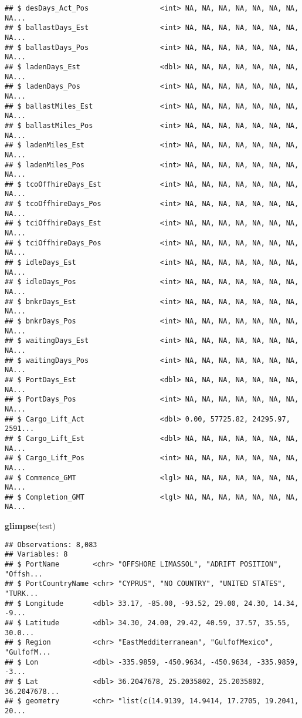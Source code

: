 \documentclass[]{article}
\newenvironment{Shaded}{\begin{snugshade}}{\end{snugshade}}
\newcommand{\KeywordTok}[1]{\textcolor[rgb]{0.13,0.29,0.53}{\textbf{#1}}}
\newcommand{\NormalTok}[1]{#1}
\begin{document}
\begin{verbatim}
## $ desDays_Act_Pos                 <int> NA, NA, NA, NA, NA, NA, NA, NA...
## $ ballastDays_Est                 <int> NA, NA, NA, NA, NA, NA, NA, NA...
## $ ballastDays_Pos                 <int> NA, NA, NA, NA, NA, NA, NA, NA...
## $ ladenDays_Est                   <dbl> NA, NA, NA, NA, NA, NA, NA, NA...
## $ ladenDays_Pos                   <int> NA, NA, NA, NA, NA, NA, NA, NA...
## $ ballastMiles_Est                <int> NA, NA, NA, NA, NA, NA, NA, NA...
## $ ballastMiles_Pos                <int> NA, NA, NA, NA, NA, NA, NA, NA...
## $ ladenMiles_Est                  <int> NA, NA, NA, NA, NA, NA, NA, NA...
## $ ladenMiles_Pos                  <int> NA, NA, NA, NA, NA, NA, NA, NA...
## $ tcoOffhireDays_Est              <int> NA, NA, NA, NA, NA, NA, NA, NA...
## $ tcoOffhireDays_Pos              <int> NA, NA, NA, NA, NA, NA, NA, NA...
## $ tciOffhireDays_Est              <int> NA, NA, NA, NA, NA, NA, NA, NA...
## $ tciOffhireDays_Pos              <int> NA, NA, NA, NA, NA, NA, NA, NA...
## $ idleDays_Est                    <int> NA, NA, NA, NA, NA, NA, NA, NA...
## $ idleDays_Pos                    <int> NA, NA, NA, NA, NA, NA, NA, NA...
## $ bnkrDays_Est                    <int> NA, NA, NA, NA, NA, NA, NA, NA...
## $ bnkrDays_Pos                    <int> NA, NA, NA, NA, NA, NA, NA, NA...
## $ waitingDays_Est                 <int> NA, NA, NA, NA, NA, NA, NA, NA...
## $ waitingDays_Pos                 <int> NA, NA, NA, NA, NA, NA, NA, NA...
## $ PortDays_Est                    <dbl> NA, NA, NA, NA, NA, NA, NA, NA...
## $ PortDays_Pos                    <int> NA, NA, NA, NA, NA, NA, NA, NA...
## $ Cargo_Lift_Act                  <dbl> 0.00, 57725.82, 24295.97, 2591...
## $ Cargo_Lift_Est                  <dbl> NA, NA, NA, NA, NA, NA, NA, NA...
## $ Cargo_Lift_Pos                  <int> NA, NA, NA, NA, NA, NA, NA, NA...
## $ Commence_GMT                    <lgl> NA, NA, NA, NA, NA, NA, NA, NA...
## $ Completion_GMT                  <lgl> NA, NA, NA, NA, NA, NA, NA, NA...
\end{verbatim}

\begin{Shaded}
\begin{Highlighting}[]
\KeywordTok{glimpse}\NormalTok{(test)}
\end{Highlighting}
\end{Shaded}

\begin{verbatim}
## Observations: 8,083
## Variables: 8
## $ PortName        <chr> "OFFSHORE LIMASSOL", "ADRIFT POSITION", "Offsh...
## $ PortCountryName <chr> "CYPRUS", "NO COUNTRY", "UNITED STATES", "TURK...
## $ Longitude       <dbl> 33.17, -85.00, -93.52, 29.00, 24.30, 14.34, -9...
## $ Latitude        <dbl> 34.30, 24.00, 29.42, 40.59, 37.57, 35.55, 30.0...
## $ Region          <chr> "EastMedditerranean", "GulfofMexico", "GulfofM...
## $ Lon             <dbl> -335.9859, -450.9634, -450.9634, -335.9859, -3...
## $ Lat             <dbl> 36.2047678, 25.2035802, 25.2035802, 36.2047678...
## $ geometry        <chr> "list(c(14.9139, 14.9414, 17.2705, 19.2041, 20...
\end{verbatim}
\end{document}
